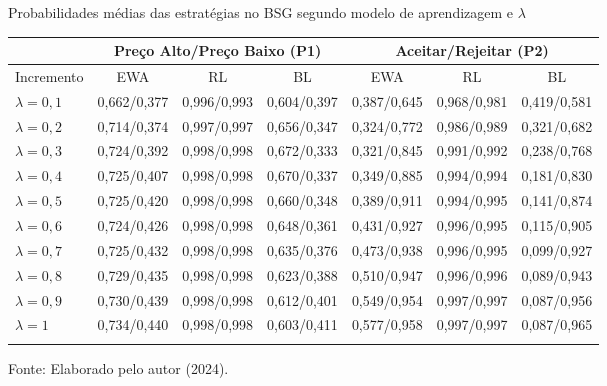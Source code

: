 \begin{tabela}[H]
	\small
	\centering
	\caption{Probabilidades médias das estratégias no BSG segundo modelo de aprendizagem e $\lambda$}
	\begin{tabular}{l|c c c|c c c}
		\Xhline{2\arrayrulewidth}
		& \multicolumn{3}{c|}{Preço Alto/Preço Baixo (P1)} & \multicolumn{3}{c}{Aceitar/Rejeitar (P2)} \\ 
		\hline
		Incremento & EWA & RL & BL & EWA & RL & BL \\ \hline
		$\lambda = 0,1$ & 0,662/0,377 & 0,996/0,993 & 0,604/0,397 & 0,387/0,645 & 0,968/0,981 & 0,419/0,581 \\
		$\lambda = 0,2$ & 0,714/0,374 & 0,997/0,997 & 0,656/0,347 & 0,324/0,772 & 0,986/0,989 & 0,321/0,682 \\
		$\lambda = 0,3$ & 0,724/0,392 & 0,998/0,998 & 0,672/0,333 & 0,321/0,845 & 0,991/0,992 & 0,238/0,768 \\
		$\lambda = 0,4$ & 0,725/0,407 & 0,998/0,998 & 0,670/0,337 & 0,349/0,885 & 0,994/0,994 & 0,181/0,830 \\
		$\lambda = 0,5$ & 0,725/0,420 & 0,998/0,998 & 0,660/0,348 & 0,389/0,911 & 0,994/0,995 & 0,141/0,874 \\
		$\lambda = 0,6$ & 0,724/0,426 & 0,998/0,998 & 0,648/0,361 & 0,431/0,927 & 0,996/0,995 & 0,115/0,905 \\
		$\lambda = 0,7$ & 0,725/0,432 & 0,998/0,998 & 0,635/0,376 & 0,473/0,938 & 0,996/0,995 & 0,099/0,927 \\
		$\lambda = 0,8$ & 0,729/0,435 & 0,998/0,998 & 0,623/0,388 & 0,510/0,947 & 0,996/0,996 & 0,089/0,943 \\
		$\lambda = 0,9$ & 0,730/0,439 & 0,998/0,998 & 0,612/0,401 & 0,549/0,954 & 0,997/0,997 & 0,087/0,956 \\
		$\lambda = 1$ & 0,734/0,440 & 0,998/0,998 & 0,603/0,411 & 0,577/0,958 & 0,997/0,997 & 0,087/0,965 \\
		\Xhline{2\arrayrulewidth}
	\end{tabular}
	\label{tabela_7}
	\caption*{\fontsize{10}{12}\selectfont Fonte: Elaborado pelo autor (2024).}
\end{tabela}
